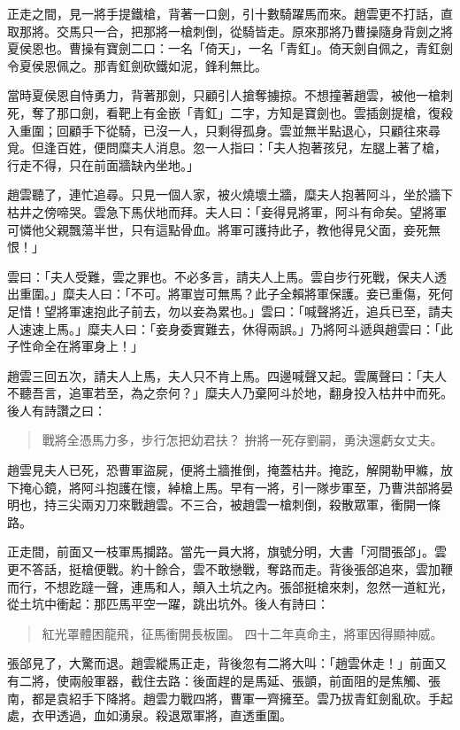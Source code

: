 正走之間，見一將手提鐵槍，背著一口劍，引十數騎躍馬而來。趙雲更不打話，直取那將。交馬只一合，把那將一槍刺倒，從騎皆走。原來那將乃曹操隨身背劍之將夏侯恩也。曹操有寶劍二口：一名「倚天」，一名「青釭」。倚天劍自佩之，青釭劍令夏侯恩佩之。那青釭劍砍鐵如泥，鋒利無比。

當時夏侯恩自恃勇力，背著那劍，只顧引人搶奪擄掠。不想撞著趙雲，被他一槍刺死，奪了那口劍，看靶上有金嵌「青釭」二字，方知是寶劍也。雲插劍提槍，復殺入重圍；回顧手下從騎，已沒一人，只剩得孤身。雲並無半點退心，只顧往來尋覓。但逢百姓，便問糜夫人消息。忽一人指曰：「夫人抱著孩兒，左腿上著了槍，行走不得，只在前面牆缺內坐地。」

趙雲聽了，連忙追尋。只見一個人家，被火燒壞土牆，糜夫人抱著阿斗，坐於牆下枯井之傍啼哭。雲急下馬伏地而拜。夫人曰：「妾得見將軍，阿斗有命矣。望將軍可憐他父親飄蕩半世，只有這點骨血。將軍可護持此子，教他得見父面，妾死無恨！」

雲曰：「夫人受難，雲之罪也。不必多言，請夫人上馬。雲自步行死戰，保夫人透出重圍。」糜夫人曰：「不可。將軍豈可無馬？此子全賴將軍保護。妾已重傷，死何足惜！望將軍速抱此子前去，勿以妾為累也。」雲曰：「喊聲將近，追兵已至，請夫人速速上馬。」糜夫人曰：「妾身委實難去，休得兩誤。」乃將阿斗遞與趙雲曰：「此子性命全在將軍身上！」

趙雲三回五次，請夫人上馬，夫人只不肯上馬。四邊喊聲又起。雲厲聲曰：「夫人不聽吾言，追軍若至，為之奈何？」糜夫人乃棄阿斗於地，翻身投入枯井中而死。後人有詩讚之曰：

\begin{quote}
戰將全憑馬力多，步行怎把幼君扶？
拚將一死存劉嗣，勇決還虧女丈夫。
\end{quote}

趙雲見夫人已死，恐曹軍盜屍，便將土牆推倒，掩蓋枯井。掩訖，解開勒甲縧，放下掩心鏡，將阿斗抱護在懷，綽槍上馬。早有一將，引一隊步軍至，乃曹洪部將晏明也，持三尖兩刃刀來戰趙雲。不三合，被趙雲一槍刺倒，殺散眾軍，衝開一條路。

正走間，前面又一枝軍馬攔路。當先一員大將，旗號分明，大書「河間張郃」。雲更不答話，挺槍便戰。約十餘合，雲不敢戀戰，奪路而走。背後張郃追來，雲加鞭而行，不想趷躂一聲，連馬和人，顛入土坑之內。張郃挺槍來刺，忽然一道紅光，從土坑中衝起：那匹馬平空一躍，跳出坑外。後人有詩曰：

\begin{quote}
紅光罩體困龍飛，征馬衝開長板圍。
四十二年真命主，將軍因得顯神威。
\end{quote}

張郃見了，大驚而退。趙雲縱馬正走，背後忽有二將大叫：「趙雲休走！」前面又有二將，使兩般軍器，截住去路：後面趕的是馬延、張顗，前面阻的是焦觸、張南，都是袁紹手下降將。趙雲力戰四將，曹軍一齊擁至。雲乃拔青釭劍亂砍。手起處，衣甲透過，血如湧泉。殺退眾軍將，直透重圍。

